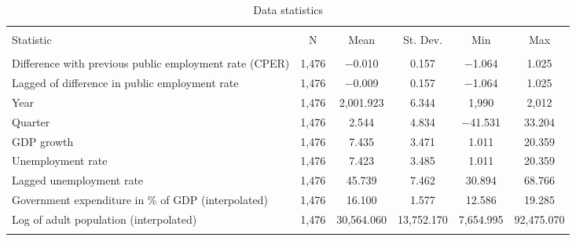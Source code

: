 
\begin{table}[!htbp] \centering 
  \caption{Data statistics} 
  \label{} 
\footnotesize 
\begin{tabular}{@{\extracolsep{5pt}}lccccc} 
\\[-1.8ex]\hline 
\hline \\[-1.8ex] 
Statistic & \multicolumn{1}{c}{N} & \multicolumn{1}{c}{Mean} & \multicolumn{1}{c}{St. Dev.} & \multicolumn{1}{c}{Min} & \multicolumn{1}{c}{Max} \\ 
\hline \\[-1.8ex] 
Difference with previous public employment rate (CPER) & 1,476 & $-$0.010 & 0.157 & $-$1.064 & 1.025 \\ 
Lagged of difference in public employment rate & 1,476 & $-$0.009 & 0.157 & $-$1.064 & 1.025 \\ 
Year & 1,476 & 2,001.923 & 6.344 & 1,990 & 2,012 \\ 
Quarter & 1,476 & 2.544 & 4.834 & $-$41.531 & 33.204 \\ 
GDP growth & 1,476 & 7.435 & 3.471 & 1.011 & 20.359 \\ 
Unemployment rate & 1,476 & 7.423 & 3.485 & 1.011 & 20.359 \\ 
Lagged unemployment rate & 1,476 & 45.739 & 7.462 & 30.894 & 68.766 \\ 
Government expenditure in \% of GDP (interpolated) & 1,476 & 16.100 & 1.577 & 12.586 & 19.285 \\ 
Log of adult population (interpolated) & 1,476 & 30,564.060 & 13,752.170 & 7,654.995 & 92,475.070 \\ 
\hline \\[-1.8ex] 
\end{tabular} 
\end{table} 

